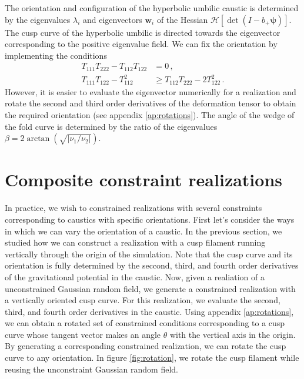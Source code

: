 \documentclass[a4paper, 11pt]{article}
\begin{document}
The orientation and configuration of the hyperbolic umbilic caustic is determined by the eigenvalues $\lambda_i$ and eigenvectors $\bm{w}_i$ of the Hessian $\mathcal{H}\left[\det (I- b_+ \bm{\psi})\right]$. The cusp curve of the hyperbolic umbilic is directed towards the eigenvector corresponding to the positive eigenvalue field. We can fix the orientation by implementing the conditions
\begin{align}
T_{111}T_{222}-T_{112}T_{122}&=0\,,\\
T_{111}T_{122} -T_{112}^2 &\geq T_{112}T_{222}-2T_{122}^2\,.
\end{align}
However, it is easier to evaluate the eigenvector numerically for a realization and rotate the second and third order derivatives of the deformation tensor to obtain the required orientation (see appendix \ref{ap:rotations}). The angle of the wedge of the fold curve is determined by the ratio of the eigenvalues $\beta = 2 \arctan(\sqrt{|\nu_1/\nu_2|})$.


\section{Composite constraint realizations}
In practice, we wish to constrained realizations with several constraints corresponding to caustics with specific orientations. First let's consider the ways in which we can vary the orientation of a caustic. In the previous section, we studied how we can construct a realization with a cusp filament running vertically through the origin of the simulation. Note that the cusp curve and its orientation is fully determined by the seccond, third, and fourth order derivatives of the gravitational potential in the caustic. Now, given a realiation of a unconstrained Gaussian random field, we generate a constrained realization with a vertically oriented cusp curve. For this realization, we evaluate the second, third, and fourth order derivatives in the caustic. Using appendix \ref{ap:rotations}, we can obtain a rotated set of constrained conditions corresponding to a cusp curve whose tangent vector makes an angle $\theta$ with the vertical axis in the origin. By generating a corresponding constrained realization, we can rotate the cusp curve to any orientation. In figure \ref{fig:rotation}, we rotate the cusp filament while reusing the unconstraint Gaussian random field.
\end{document}
